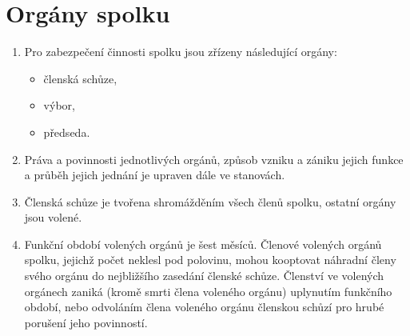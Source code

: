 \documentclass[11pt,a4paper]{article}
\begin{document}
\section{Orgány spolku}
\begin{enumerate}[itemsep=0pt]
    \item  Pro zabezpečení činnosti spolku jsou zřízeny následující orgány: 
    \begin{itemize}[itemsep=0pt,topsep=0pt]
        \item členská schůze,
        \item výbor,
        \item předseda.
    \end{itemize}
    \item Práva a povinnosti jednotlivých orgánů, způsob vzniku a zániku jejich 
    funkce a průběh jejich jednání je upraven dále ve stanovách.
    \item Členská schůze je tvořena shromážděním všech členů spolku, ostatní 
    orgány jsou volené.
    \item Funkční období volených orgánů je šest měsíců. Členové volených 
    orgánů spolku, jejichž počet neklesl pod polovinu, mohou kooptovat náhradní 
    členy svého orgánu do nejbližšího zasedání členské schůze. Členství 
    ve volených orgánech zaniká (kromě smrti člena voleného orgánu) uplynutím 
    funkčního období, nebo odvoláním člena voleného orgánu členskou schůzí 
    pro hrubé porušení jeho povinností.
\end{enumerate}
\end{document}
